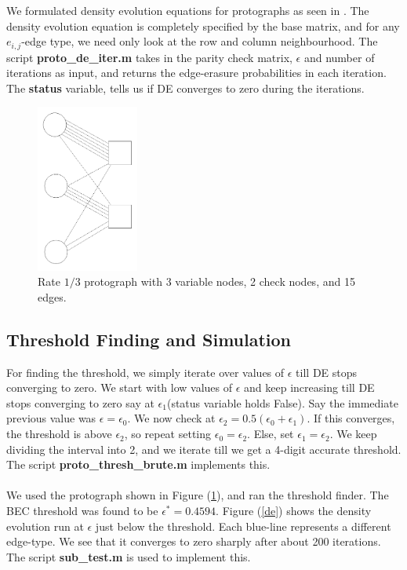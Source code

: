 \documentclass[paper=a4, fontsize=12pt]{scrartcl} %
\numberwithin{equation}{section} %
\numberwithin{figure}{section} %
\numberwithin{table}{section} %
\begin{document}
We formulated density evolution equations for protographs as seen in \cite{Lent}. The density evolution equation is  completely specified by the base matrix, and for any $e_{i,j}$-edge type, we need only look at the row and column neighbourhood. The script \textbf{proto\_de\_iter.m} takes in the parity check matrix, $\epsilon$ and number of iterations as input, and returns the edge-erasure probabilities in each iteration. The \textbf{status} variable, tells us if DE converges to zero during the iterations. 

\begin{figure}
\centering
\includegraphics[width=0.3\textwidth]{images/modified-proto}
\caption{Rate $1/3$ protograph with 3 variable nodes, 2 check nodes, and 15 edges. }
\label{proto}
\end{figure}

\subsection{Threshold Finding and Simulation}
For finding the threshold, we simply iterate over values of $\epsilon$ till DE stops converging to zero. We start with low values of $\epsilon$ and keep increasing till DE stops converging to zero say at $\epsilon_1$(status variable holds False). Say the immediate previous value was $\epsilon=\epsilon_0$. We now check at $\epsilon_2 = 0.5(\epsilon_0+\epsilon_1)$. If this converges, the threshold is above $\epsilon_2$, so repeat setting $\epsilon_0=\epsilon_2$. Else, set $\epsilon_1=\epsilon_2$. We keep dividing the interval into 2, and we iterate till we get a 4-digit accurate threshold. The script \textbf{proto\_thresh\_brute.m} implements this.
\\ \\
We used the protograph shown in Figure (\ref{proto}), and ran the threshold finder. The BEC threshold was found to be $\epsilon^* = 0.4594$. Figure (\ref{de}) shows the density evolution run at $\epsilon$ just below the threshold. Each blue-line represents a different edge-type. We see that it converges to zero sharply after about 200 iterations. The script \textbf{sub\_test.m} is used to implement this. 
\end{document}
